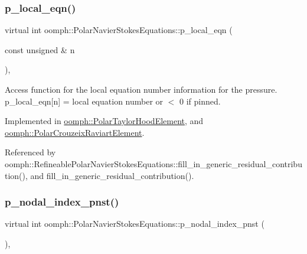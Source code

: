 \subsubsection{\texorpdfstring{p\+\_\+local\+\_\+eqn()}{p\_local\_eqn()}}
{\footnotesize\ttfamily virtual int oomph\+::\+Polar\+Navier\+Stokes\+Equations\+::p\+\_\+local\+\_\+eqn (\begin{DoxyParamCaption}\item[{const unsigned \&}]{n }\end{DoxyParamCaption})\hspace{0.3cm}{\ttfamily [protected]}, {}}



Access function for the local equation number information for the pressure. p\+\_\+local\+\_\+eqn\mbox{[}n\mbox{]} = local equation number or $<$ 0 if pinned. 



Implemented in \hyperlink{classoomph_1_1PolarTaylorHoodElement_ab50b43e4dadba14413f8b84b35eea9aa}{oomph\+::\+Polar\+Taylor\+Hood\+Element}, and \hyperlink{classoomph_1_1PolarCrouzeixRaviartElement_a13dafb71fd6a720e02a6382b1a3274e7}{oomph\+::\+Polar\+Crouzeix\+Raviart\+Element}.



Referenced by oomph\+::\+Refineable\+Polar\+Navier\+Stokes\+Equations\+::fill\+\_\+in\+\_\+generic\+\_\+residual\+\_\+contribution(), and fill\+\_\+in\+\_\+generic\+\_\+residual\+\_\+contribution().

\mbox{\label{classoomph_1_1PolarNavierStokesEquations_a79266ebf090ed45e71631e9c704f33a5}} 
\subsubsection{\texorpdfstring{p\+\_\+nodal\+\_\+index\+\_\+pnst()}{p\_nodal\_index\_pnst()}}
{\footnotesize\ttfamily virtual int oomph\+::\+Polar\+Navier\+Stokes\+Equations\+::p\+\_\+nodal\+\_\+index\+\_\+pnst (\begin{DoxyParamCaption}{ }\end{DoxyParamCaption})\hspace{0.3cm}{\ttfamily [inline]}, {\ttfamily [virtual]}}



